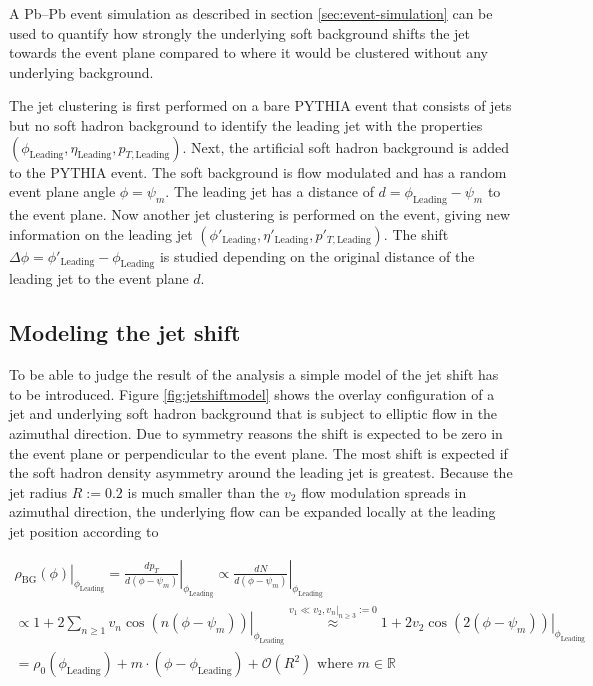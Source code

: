 \documentclass[
  a4paper,
  12pt,
  oneside,
  parskip=half,
  listof=totoc,
  bibliography=totoc,
  DIV=12,
  numbers=noenddot,
  BA.tex
  ]{subfiles}
\begin{document}
A Pb--Pb event simulation as described in section \ref{sec:event-simulation} can be used to quantify how strongly the underlying soft background shifts the jet towards the event plane compared to where it would be clustered without any underlying background.

The jet clustering is first performed on a bare PYTHIA event that consists of jets but no soft hadron background to identify the leading jet with the properties $(\phi_{\text{Leading}}, \eta_{\text{Leading}}, p_{T,\text{Leading}})$. Next, the artificial soft hadron background is added to the PYTHIA event. The soft background is flow modulated and has a random event plane angle $\phi = \psi_m$. The leading jet has a distance of $d = \phi_{\text{Leading}} - \psi_m$ to the event plane. Now another jet clustering is performed on the event, giving new information on the leading jet $(\phi'_{\text{Leading}}, \eta'_{\text{Leading}}, p'_{T,\text{Leading}})$. The shift $\Delta \phi = \phi'_{\text{Leading}} - \phi_{\text{Leading}}$ is studied depending on the original distance of the leading jet to the event plane $d$. 

\subsection{Modeling the jet shift}
\label{sec:modeling-jet-shift}

To be able to judge the result of the analysis a simple model of the jet shift has to be introduced. Figure \ref{fig:jetshiftmodel} shows the overlay configuration of a jet and underlying soft hadron background that is subject to elliptic flow in the azimuthal direction. Due to symmetry reasons the shift is expected to be zero in the event plane or perpendicular to the event plane. The most shift is expected if the soft hadron density asymmetry around the leading jet is greatest. Because the jet radius $R := 0.2$ is much smaller than the $v_2$ flow modulation spreads in azimuthal direction, the underlying flow can be expanded locally at the leading jet position according to

\begin{equation}
	\begin{gathered}
		\left. \rho_\text{BG}(\phi) \right|_{\phi_\text{Leading}} = \left. \frac{d p_T}{d (\phi - \psi_m)} \right|_{\phi_\text{Leading}} \propto \left. \frac{d N}{d (\phi - \psi_m)} \right|_{\phi_\text{Leading}} \\ \propto \left. 1 + 2 \sum_{n \geq 1}^{} v_n \cos(n (\phi - \psi_m)) \right|_{\phi_\text{Leading}}
		\stackrel{v_1 \ll v_2, v_n|_{n \geq 3} := 0}{\approx} \left. 1 + 2v_2 \cos(2(\phi - \psi_m)) \right|_{\phi_\text{Leading}}\\
		= \rho_0(\phi_\text{Leading}) + m \cdot (\phi - \phi_\text{Leading}) + \mathcal{O}(R^2) \text{ where } m \in \mathbb{R}
	\end{gathered}
	\label{eq:background_density}
\end{equation}
\end{document}

